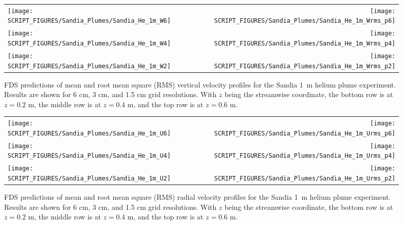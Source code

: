 \begin{figure}[p]
\begin{tabular*}{\textwidth}{l@{\extracolsep{\fill}}r}
\texttt{[image: SCRIPT\_FIGURES/Sandia\_Plumes/Sandia\_He\_1m\_W6]} &
\texttt{[image: SCRIPT\_FIGURES/Sandia\_Plumes/Sandia\_He\_1m\_Wrms\_p6]} \\
\texttt{[image: SCRIPT\_FIGURES/Sandia\_Plumes/Sandia\_He\_1m\_W4]} &
\texttt{[image: SCRIPT\_FIGURES/Sandia\_Plumes/Sandia\_He\_1m\_Wrms\_p4]} \\
\texttt{[image: SCRIPT\_FIGURES/Sandia\_Plumes/Sandia\_He\_1m\_W2]} &
\texttt{[image: SCRIPT\_FIGURES/Sandia\_Plumes/Sandia\_He\_1m\_Wrms\_p2]}
\end{tabular*}
\caption[Sandia 1~m helium plume vertical velocity profiles]
{FDS predictions of mean and root mean square (RMS) vertical velocity profiles for the Sandia 1~m helium plume experiment. Results are shown for 6 cm, 3 cm, and 1.5 cm grid resolutions. With $z$ being the streamwise coordinate, the bottom row is at $z=0.2$ m, the middle row is at $z=0.4$ m, and the top row is at $z=0.6$ m.}
\label{Sandia_He_1m_velocity}
\end{figure}

\begin{figure}[p]
\begin{tabular*}{\textwidth}{l@{\extracolsep{\fill}}r}
\texttt{[image: SCRIPT\_FIGURES/Sandia\_Plumes/Sandia\_He\_1m\_U6]} &
\texttt{[image: SCRIPT\_FIGURES/Sandia\_Plumes/Sandia\_He\_1m\_Urms\_p6]} \\
\texttt{[image: SCRIPT\_FIGURES/Sandia\_Plumes/Sandia\_He\_1m\_U4]} &
\texttt{[image: SCRIPT\_FIGURES/Sandia\_Plumes/Sandia\_He\_1m\_Urms\_p4]} \\
\texttt{[image: SCRIPT\_FIGURES/Sandia\_Plumes/Sandia\_He\_1m\_U2]} &
\texttt{[image: SCRIPT\_FIGURES/Sandia\_Plumes/Sandia\_He\_1m\_Urms\_p2]}
\end{tabular*}
\caption[Sandia 1~m helium plume radial velocity profiles.]
{FDS predictions of mean and root mean square (RMS) radial velocity profiles for the Sandia 1~m helium plume experiment. Results are shown for 6 cm, 3 cm, and 1.5 cm grid resolutions. With $z$ being the streamwise coordinate, the bottom row is at $z=0.2$ m, the middle row is at $z=0.4$ m, and the top row is at $z=0.6$ m.}
\label{Sandia_He_1m_velocity_rms}
\end{figure}


